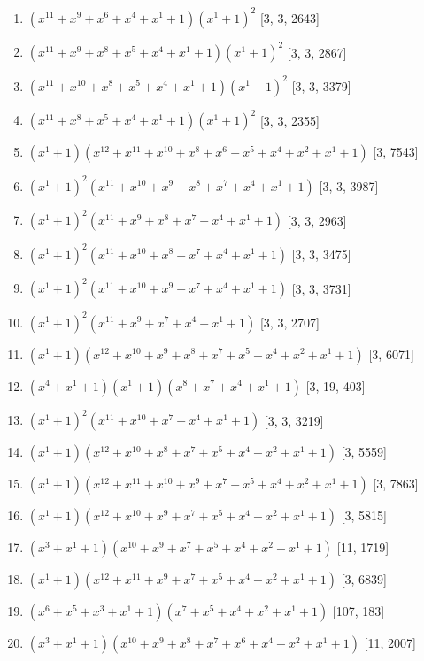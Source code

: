 \documentclass[10pt,twocolumn]{article}
\begin{document}
\begin{enumerate}
\item $(x^{11} + x^{9} + x^{6} + x^{4} + x^{1} + 1)(x^{1} + 1)^{2}$  [3, 3, 2643]
\item $(x^{11} + x^{9} + x^{8} + x^{5} + x^{4} + x^{1} + 1)(x^{1} + 1)^{2}$  [3, 3, 2867]
\item $(x^{11} + x^{10} + x^{8} + x^{5} + x^{4} + x^{1} + 1)(x^{1} + 1)^{2}$  [3, 3, 3379]
\item $(x^{11} + x^{8} + x^{5} + x^{4} + x^{1} + 1)(x^{1} + 1)^{2}$  [3, 3, 2355]
\item $(x^{1} + 1)(x^{12} + x^{11} + x^{10} + x^{8} + x^{6} + x^{5} + x^{4} + x^{2} + x^{1} + 1)$  [3, 7543]
\item $(x^{1} + 1)^{2}(x^{11} + x^{10} + x^{9} + x^{8} + x^{7} + x^{4} + x^{1} + 1)$  [3, 3, 3987]
\item $(x^{1} + 1)^{2}(x^{11} + x^{9} + x^{8} + x^{7} + x^{4} + x^{1} + 1)$  [3, 3, 2963]
\item $(x^{1} + 1)^{2}(x^{11} + x^{10} + x^{8} + x^{7} + x^{4} + x^{1} + 1)$  [3, 3, 3475]
\item $(x^{1} + 1)^{2}(x^{11} + x^{10} + x^{9} + x^{7} + x^{4} + x^{1} + 1)$  [3, 3, 3731]
\item $(x^{1} + 1)^{2}(x^{11} + x^{9} + x^{7} + x^{4} + x^{1} + 1)$  [3, 3, 2707]
\item $(x^{1} + 1)(x^{12} + x^{10} + x^{9} + x^{8} + x^{7} + x^{5} + x^{4} + x^{2} + x^{1} + 1)$  [3, 6071]
\item $(x^{4} + x^{1} + 1)(x^{1} + 1)(x^{8} + x^{7} + x^{4} + x^{1} + 1)$  [3, 19, 403]
\item $(x^{1} + 1)^{2}(x^{11} + x^{10} + x^{7} + x^{4} + x^{1} + 1)$  [3, 3, 3219]
\item $(x^{1} + 1)(x^{12} + x^{10} + x^{8} + x^{7} + x^{5} + x^{4} + x^{2} + x^{1} + 1)$  [3, 5559]
\item $(x^{1} + 1)(x^{12} + x^{11} + x^{10} + x^{9} + x^{7} + x^{5} + x^{4} + x^{2} + x^{1} + 1)$  [3, 7863]
\item $(x^{1} + 1)(x^{12} + x^{10} + x^{9} + x^{7} + x^{5} + x^{4} + x^{2} + x^{1} + 1)$  [3, 5815]
\item $(x^{3} + x^{1} + 1)(x^{10} + x^{9} + x^{7} + x^{5} + x^{4} + x^{2} + x^{1} + 1)$  [11, 1719]
\item $(x^{1} + 1)(x^{12} + x^{11} + x^{9} + x^{7} + x^{5} + x^{4} + x^{2} + x^{1} + 1)$  [3, 6839]
\item $(x^{6} + x^{5} + x^{3} + x^{1} + 1)(x^{7} + x^{5} + x^{4} + x^{2} + x^{1} + 1)$  [107, 183]
\item $(x^{3} + x^{1} + 1)(x^{10} + x^{9} + x^{8} + x^{7} + x^{6} + x^{4} + x^{2} + x^{1} + 1)$  [11, 2007]

\end{enumerate}
\end{document}
